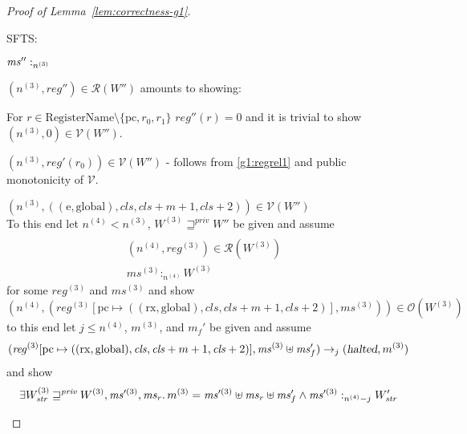 \documentclass[a4paper]{article}
\newcommand{\update}[2]{[#1 \mapsto #2]}
\newcommand{\var}[1]{\mathit{#1}}
\newcommand{\hs}{\var{ms}}
\newcommand{\ms}{\hs}
\newcommand{\pcreg}{\mathrm{pc}}
\newcommand{\reg}{\var{reg}}
\newcommand{\heap}{\var{mem}}
\newcommand{\halted}{\textsl{halted}}
\newcommand{\futurestr}{\mathbin{\sqsupseteq}^{\var{priv}}}
\newcommand{\heapSat}[3][\heap]{#1 :_{#2} #3}
\newcommand{\memSat}[3][n]{\heapSat[#2]{#1}{#3}}
\newcommand{\asmType}{\plaindom{AsmType}}
\newcommand{\plaindom}[1]{\mathrm{#1}}
\newcommand{\RegName}{\plaindom{RegisterName}}
\newcommand{\intr}[2]{\mathcal{#1}}
\newcommand{\valueintr}[1]{\intr{V}{#1}}
\newcommand{\regintr}[1]{\intr{R}{#1}}
\newcommand{\stdvr}{\valueintr{\asmType}}
\newcommand{\stdrr}{\regintr{\asmType}}
\newcommand{\observations}{\mathcal{O}}
\newcommand{\npair}[2][n]{\left(#1,#2 \right)}
\newcommand{\plainperm}[1]{\mathrm{#1}}
\newcommand{\exec}{\plainperm{rx}}
\newcommand{\entry}{\plainperm{e}}
\newcommand{\glob}{\plainperm{global}}
\newcommand{\step}[1][]{\rightarrow_{#1}}
\begin{document}
\begin{proof}[Proof of Lemma~\ref{lem:correctness-g1}]
\begin{enumproof}
\begin{enumproof}
      SFTS:
      \begin{enumproof}
      \item$\memSat[n^{(3)}]{\ms''}$
      \item $\npair[n^{(3)}]{\reg''} \in \stdrr(W'')$ amounts to showing:
        \begin{enumproof}
        \item For $r \in \RegName \setminus \{\pcreg, r_0, r_1 \}$ $\reg''(r) = 0$ and it is trivial to show $\npair[n^{(3)}]{0} \in \stdvr(W'')$. 
        \item $\npair[n^{(3)}]{\reg'(r_0)} \in \stdvr(W'')$ - follows from \ref{g1:regrel1} and public monotonicity of $\stdvr$.
        \item $\npair[n^{(3)}]{((\entry,\glob),\var{cls},\var{cls} + m + 1,\var{cls}+2)} \in \stdvr(W'')$ \\
          To this end let $n^{(4)} < n^{(3)}$, $W^{(3)} \futurestr W''$ be given and assume
          \begin{align}
            \\ \npair[n^{(4)}]{\reg^{(3)}} \in \stdrr(W^{(3)}) \label{g1:reg-file-cls} &
            \\ \memSat[n^{(4)}]{\ms^{(3)}}{W^{(3)}} \label{g1:memsat-cls}
          \end{align}
          for some $\reg^{(3)}$ and $\ms^{(3)}$ and show
          \[
            \npair[n^{(4)}]{(\reg^{(3)}\update{\pcreg}{((\exec,\glob),\var{cls},\var{cls} + m + 1,\var{cls}+2)},\ms^{(3)})} \in \observations(W^{(3)})
          \]
          to this end let $j \leq n^{(4)}$, $m^{(3)}$, and $m_f'$ be given and assume
          \begin{equation}
            (\reg^{(3)}\update{\pcreg}{((\exec,\glob),\var{cls},\var{cls} + m + 1,\var{cls}+2)},\ms^{(3)} \uplus \ms_f') \step[j] (\halted, m^{(3)}) \label{g1:execution2}
          \end{equation}
          and show
          \begin{equation}
            \exists W_{\var{str}}^{(3)} \futurestr W^{(3)}, \ms'^{(3)}, \ms_r \ldotp m^{(3)} = \ms'^{(3)} \uplus \ms_r \uplus \ms_f' \land \memSat[n^{(4)}-j]{\ms'^{(3)}}{W_{\var{str}}'} \label{g1:g-goal2}

\end{equation}
\end{enumproof}
\end{enumproof}
\end{enumproof}
\end{enumproof}
\end{proof}
\end{document}
